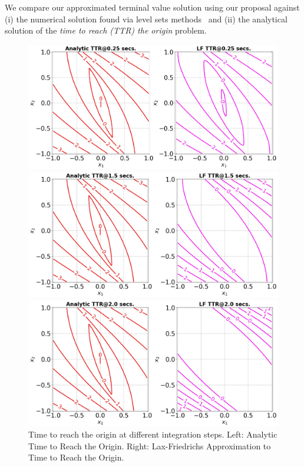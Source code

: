 %
%

We compare our approximated terminal value solution using our proposal against (i) the numerical solution found via level sets methods~\cite{LevelSetsBook}  and (ii) the analytical solution of the \textit{time to reach (TTR) the origin} problem.

\begin{figure}[tb!]
	\centering
	\begin{minipage}[b]{.5\textwidth}
		\includegraphics[width=.8\textwidth]{figures/dint_ttr_0.25.jpg}
	\end{minipage}
	\begin{minipage}[b]{.5\textwidth}
		\includegraphics[width=.8\textwidth]{figures/dint_ttr_1.5.jpg}
	\end{minipage}
	\begin{minipage}[b]{.5\textwidth}
		\includegraphics[width=.8\textwidth]{figures/dint_ttr_2.0.jpg}
	\end{minipage}
	\caption{\footnotesize Time to reach the origin at different integration steps. Left: Analytic Time to Reach the Origin. Right: Lax-Friedrichs Approximation to Time to Reach the Origin.}
	\label{fig:ttr_ls}
\end{figure}

